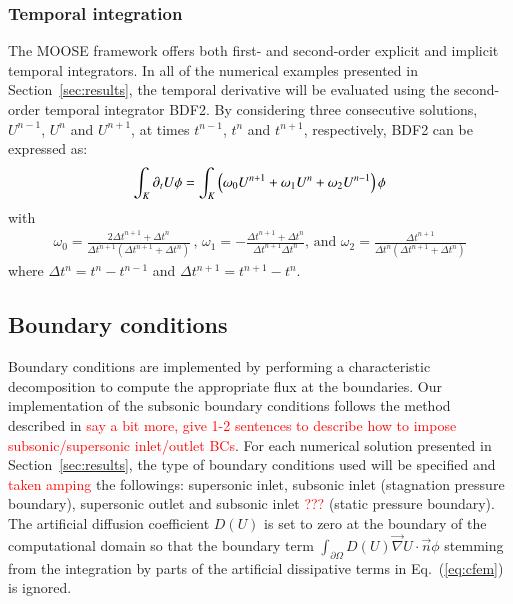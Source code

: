\documentclass[preprint,10pt]{elsarticle}
\newcommand{\grad}{\vec{\nabla}}
\newcommand{\eqt}[1]{Eq.~(\ref{#1})}                     %
\newcommand{\sct}[1]{Section~\ref{#1}}                   %
\newcommand{\tcr}[1]{\textcolor{red}{#1}}
\begin{document}
\subsubsection{Temporal integration} 
The MOOSE framework offers both first- and second-order explicit and implicit temporal integrators. In all of the numerical examples presented in \sct{sec:results}, the temporal derivative  will be evaluated using the second-order temporal integrator BDF2. By considering three consecutive solutions, $U^{n-1}$, $U^n$ and $U^{n+1}$, at times $t^{n-1}$, $t^n$ and $t^{n+1}$, respectively, BDF2 can be expressed as:
\begin{equation}
\label{eq:BDF2}
\int_{K} \partial_t U \phi = \int_{K} \left( \omega_0 U^{n+1}  + \omega_1 U^n + \omega_2 U^{n-1} \right) \phi\\
\end{equation}
%
with
\begin{multline}
\omega_0 =\frac{2\Delta t^{n+1}+\Delta t^n}{\Delta t^{n+1} \left( \Delta t^{n+1}+\Delta t^n \right)} \,,\,
\omega_1 = -\frac{\Delta t^{n+1}+\Delta t^n}{\Delta t^{n+1} \Delta t^n} 
\text{, and } \omega_2 = \frac{\Delta t^{n+1}}{\Delta t^n \left( \Delta t^{n+1} + \Delta t^n \right)} \nonumber
\end{multline}
where $\Delta t^{n} = t^n-t^{n-1}$ and $\Delta t^{n+1} = t^{n+1}-t^{n}$.

\subsection{Boundary conditions} \label{sec:bc}
Boundary conditions are implemented by performing a characteristic decomposition to compute the appropriate flux at the boundaries.
Our implementation of the subsonic boundary conditions follows the method described in \cite{SEM}\tcr{say a bit more, give 1-2 sentences to describe how to impose subsonic/supersonic inlet/outlet BCs}. 
For each numerical solution presented in \sct{sec:results}, the type of boundary conditions used will be specified and \tcr{taken amping} the followings: supersonic inlet, subsonic inlet (stagnation pressure boundary), supersonic outlet and subsonic inlet \tcr{???} (static pressure boundary). \\
The artificial diffusion coefficient $D(U)$ is set to zero at the boundary of the computational domain so that the boundary term $\int_{\partial \Omega} D(U) \grad U \cdot \vec{n} \phi$ stemming from the integration by parts of the artificial dissipative terms in \eqt{eq:cfem} is ignored.
\end{document}

